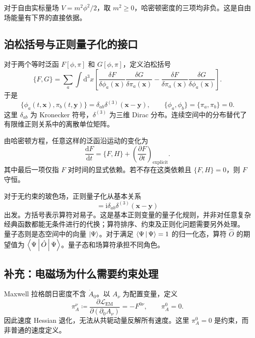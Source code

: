 对于自由实标量场 $V=m^{2}\phi^{2}/2$，取 $m^{2}\geq0$，哈密顿密度的三项均非负。这是自由场能量有下界的直接依据。

\subsection{泊松括号与正则量子化的接口}

对于两个等时泛函 $F[\phi,\pi]$ 和 $G[\phi,\pi]$，定义泊松括号
\begin{equation}
  \{F,G\}=\sum_{a}\int\mathrm{d}^{3}x\left[
    \frac{\delta F}{\delta\phi_{a}(\bm{x})}\frac{\delta G}{\delta\pi_{a}(\bm{x})}
    -\frac{\delta F}{\delta\pi_{a}(\bm{x})}\frac{\delta G}{\delta\phi_{a}(\bm{x})}\right].
\end{equation}
于是
\begin{equation}
  \{\phi_{a}(t,\bm{x}),\pi_{b}(t,\bm{y})\}
  =\delta_{ab}\delta^{(3)}(\bm{x}-\bm{y}),
  \qquad \{\phi_{a},\phi_{b}\}=\{\pi_{a},\pi_{b}\}=0.
\end{equation}
这里 $\delta_{ab}$ 为 Kronecker 符号，$\delta^{(3)}$ 为三维 Dirac 分布。连续空间中的分布替代了有限维正则关系中的离散单位矩阵。

由哈密顿方程，任意这样的泛函沿运动的变化为
\begin{equation}
  \frac{\mathrm{d}F}{\mathrm{d}t}=\{F,H\}
  +\left(\frac{\partial F}{\partial t}\right)_{\mathrm{explicit}}.
\end{equation}
其中最后一项仅指 $F$ 对时间的显式依赖。若不存在这类依赖且 $\{F,H\}=0$，则 $F$ 守恒。

对于无约束的玻色场，正则量子化从基本关系
\begin{equation}
  [\hat\phi_{a}(t,\bm{x}),\hat\pi_{b}(t,\bm{y})]
  =\mathrm{i}\delta_{ab}\delta^{(3)}(\bm{x}-\bm{y})
\end{equation}
出发。方括号表示算符对易子。这是基本正则变量的量子化规则，并非对任意复杂经典函数都能无条件进行的代换；算符排序、约束及正则化问题需要另外处理。
量子态则是态空间中的向量 $\Ket{\Psi}$。对于满足
$\Braket{\Psi|\Psi}=1$ 的归一化态，算符 $\hat O$ 的期望值为
$\Braket{\Psi|\hat O|\Psi}$。量子态和场算符承担不同角色。

\subsection{补充：电磁场为什么需要约束处理}

Maxwell 拉格朗日密度不含 $\dot A_{0}$。以 $A_{\nu}$ 为配置变量，定义
\begin{equation}
  \pi_{A}^{\nu}\coloneqq
  \frac{\partial\mathcal{L}_{\mathrm{EM}}}{\partial(\partial_{0}A_{\nu})}
  =-F^{0\nu},\qquad \pi_{A}^{0}=0.
\end{equation}
因此速度 Hessian 退化，无法从共轭动量反解所有速度。这里 $\pi_{A}^{0}=0$ 是约束，而非普通的速度定义。


